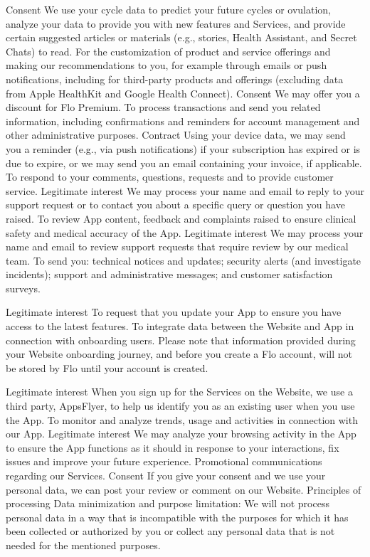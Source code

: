 Consent
We use your cycle data to predict your future cycles or ovulation, analyze your data to provide you with new features and Services, and provide certain suggested articles or materials (e.g., stories, Health Assistant, and Secret Chats) to read. 
For the customization of product and service offerings and making our recommendations to you, for example through emails or push notifications, including for third-party products and offerings (excluding data from Apple HealthKit and Google Health Connect).
Consent
We may offer you a discount for Flo Premium.
To process transactions and send you related information, including confirmations and reminders for account management and other administrative purposes.
Contract
Using your device data, we may send you a reminder (e.g., via push notifications) if your subscription has expired or is due to expire, or we may send you an email containing your invoice, if applicable.
To respond to your comments, questions, requests and to provide customer service. 
Legitimate interest
We may process your name and email to reply to your support request or to contact you about a specific query or question you have raised.
To review App content, feedback and complaints raised to ensure clinical safety and medical accuracy of the App.
Legitimate interest
We may process your name and email to review support requests that require review by our medical team.
To send you: technical notices and updates; security alerts (and investigate incidents); support and administrative messages; and  customer satisfaction surveys.  

Legitimate interest
To request that you update your App to ensure you have access to the latest features. 
To integrate data between the Website and App in connection with onboarding users. Please note that information provided during your Website onboarding journey, and before you create a Flo account, will not be stored by Flo until your account is created. 

Legitimate interest
When you sign up for the Services on the Website, we use a third party, AppsFlyer, to help us identify you as an existing user when you use the App.
To monitor and analyze trends, usage and activities in connection with our App.
Legitimate interest
We may analyze your browsing activity in the App to ensure the App functions as it should in response to your interactions, fix issues and improve your future experience.
Promotional communications regarding our Services. 
Consent
If you give your consent and we use your personal data, we can post your review or comment on our Website.
Principles of processing
Data minimization and purpose limitation: We will not process personal data in a way that is incompatible with the purposes for which it has been collected or authorized by you or collect any personal data that is not needed for the mentioned purposes.

